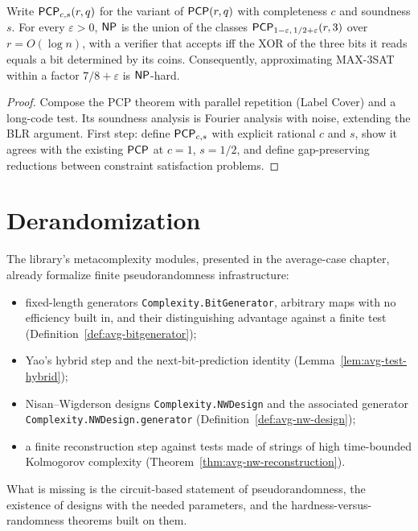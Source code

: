 \begin{theorem}
  \label{thm:frontiers-hastad}
  \notready
  Write $\mathsf{PCP}_{c,s}(r, q)$ for the variant of $\mathsf{PCP}(r,q)$ with
  completeness $c$ and soundness $s$. For every $\varepsilon > 0$, $\mathsf{NP}$ is
  the union of the classes $\mathsf{PCP}_{1-\varepsilon,\, 1/2+\varepsilon}(r, 3)$
  over $r = O(\log n)$, with a verifier that accepts iff the XOR of the three
  bits it reads equals a bit determined by its coins. Consequently,
  approximating MAX-3SAT within a factor $7/8 + \varepsilon$ is
  $\mathsf{NP}$-hard.
\end{theorem}
\begin{proof}
  Compose the PCP theorem with parallel repetition (Label Cover) and a long-code
  test. Its soundness analysis is Fourier analysis with noise, extending the BLR
  argument. First step: define $\mathsf{PCP}_{c,s}$ with explicit rational $c$ and
  $s$, show it agrees with the existing $\mathsf{PCP}$ at $c = 1$, $s = 1/2$, and
  define gap-preserving reductions between constraint satisfaction problems.
\end{proof}

\section{Derandomization}

The library's metacomplexity modules, presented in the average-case chapter,
already formalize finite pseudorandomness infrastructure:
\begin{itemize}
  \item fixed-length generators \texttt{Complexity.BitGenerator}, arbitrary maps
    with no efficiency built in, and their distinguishing advantage against a
    finite test (Definition~\ref{def:avg-bitgenerator});
  \item Yao's hybrid step and the next-bit-prediction identity
    (Lemma~\ref{lem:avg-test-hybrid});
  \item Nisan--Wigderson designs \texttt{Complexity.NWDesign} and the associated
    generator \texttt{Complexity.NWDesign.generator}
    (Definition~\ref{def:avg-nw-design});
  \item a finite reconstruction step against tests made of strings of high
    time-bounded Kolmogorov complexity
    (Theorem~\ref{thm:avg-nw-reconstruction}).
\end{itemize}
What is missing is the circuit-based statement of pseudorandomness, the
existence of designs with the needed parameters, and the
hardness-versus-randomness theorems built on them.

